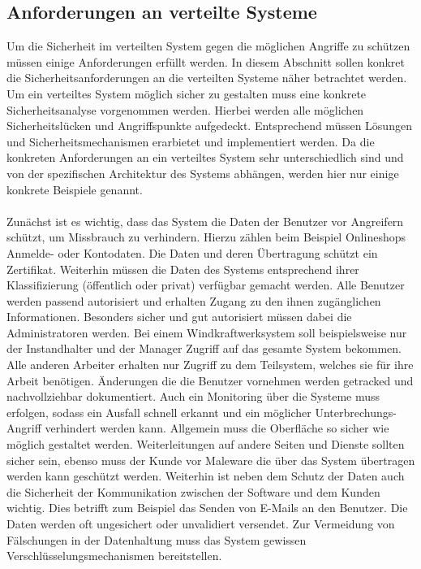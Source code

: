 \documentclass[utf8,biblatex]{lni}
\begin{document}
\subsection{Anforderungen an verteilte Systeme}
Um die Sicherheit im verteilten System gegen die möglichen Angriffe zu schützen müssen einige Anforderungen erfüllt werden. In diesem Abschnitt sollen
konkret die Sicherheitsanforderungen an die verteilten Systeme näher betrachtet werden. Um ein verteiltes System möglich sicher zu gestalten muss eine konkrete Sicherheitsanalyse vorgenommen werden.
 Hierbei werden alle möglichen Sicherheitslücken und Angriffspunkte aufgedeckt. 
Entsprechend müssen Lösungen und Sicherheitsmechanismen erarbietet und implementiert werden. Da die konkreten Anforderungen an ein verteiltes System sehr unterschiedlich sind und von der spezifischen Architektur 
des Systems abhängen, werden hier nur einige konkrete Beispiele genannt.
\\\\
Zunächst ist es wichtig, dass das System die Daten der Benutzer vor Angreifern schützt, um Missbrauch zu verhindern. Hierzu zählen beim Beispiel Onlineshops Anmelde- oder Kontodaten. Die Daten und deren Übertragung
schützt ein Zertifikat.
\newline
Weiterhin müssen die Daten des Systems entsprechend ihrer Klassifizierung (öffentlich oder privat) verfügbar gemacht werden. Alle Benutzer werden passend autorisiert und erhalten Zugang zu den ihnen zugänglichen Informationen. Besonders sicher und gut autorisiert müssen dabei die Administratoren werden.
Bei einem Windkraftwerksystem soll beispielsweise nur der Instandhalter und der Manager Zugriff auf das gesamte System bekommen. Alle anderen Arbeiter erhalten nur Zugriff zu dem Teilsystem, welches sie für ihre Arbeit benötigen.
 Änderungen die die Benutzer vornehmen
werden getracked und nachvollziehbar dokumentiert. Auch ein Monitoring über die Systeme muss erfolgen, sodass ein Ausfall schnell erkannt und ein möglicher Unterbrechungs-Angriff verhindert werden kann.
Allgemein muss die Oberfläche so sicher wie möglich gestaltet werden. Weiterleitungen auf andere Seiten und Dienste sollten sicher sein, ebenso muss der Kunde vor Maleware die über das System
übertragen werden kann geschützt werden.
Weiterhin ist neben dem Schutz der Daten auch die Sicherheit der Kommunikation zwischen der Software und dem Kunden wichtig. Dies betrifft zum Beispiel das Senden von E-Mails an den Benutzer. Die Daten werden oft ungesichert
oder unvalidiert versendet. 
Zur Vermeidung von Fälschungen in der Datenhaltung muss das System gewissen Verschlüsselungsmechanismen bereitstellen. 
\cite{Kriha.2008}
\end{document}
